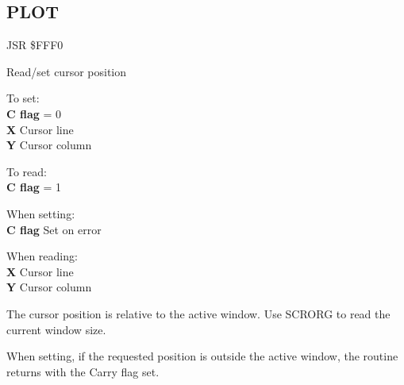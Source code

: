 \subsection{PLOT}
\label{KERNAL Jump Table!PLOT}
\begin{description}[leftmargin=2cm,style=nextline]
    \item [Address:] JSR \$FFF0
    \item [Description:] Read/set cursor position
    \item [Inputs:]
        To set: \\
        \textbf{C flag} = 0 \\
        \textbf{X} Cursor line \\
        \textbf{Y} Cursor column

        To read: \\
        \textbf{C flag} = 1
    \item [Outputs:]
        When setting: \\
        \textbf{C flag} Set on error

        When reading: \\
        \textbf{X} Cursor line \\
        \textbf{Y} Cursor column
    \item [Remarks:]
        The cursor position is relative to the active window. Use SCRORG to read the current window size.

        When setting, if the requested position is outside the active window, the routine returns with the Carry flag set.
    \item [Example:]
\end{description}



\newpage
